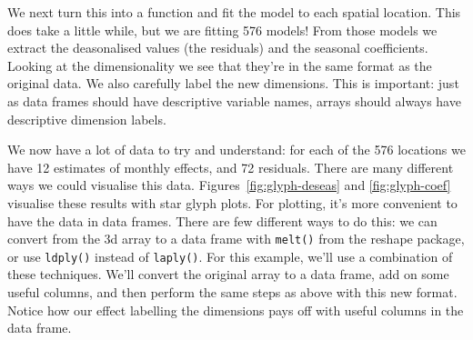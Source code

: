 \documentclass{scrartcl}
\newcommand{\f}[1]{\lstinline!#1()!}
\begin{document}
We next turn this into a function and fit the model to each spatial location.  This does take a little while, but we are fitting 576 models!  From those models we extract the deasonalised values (the residuals) and the seasonal coefficients.  Looking at the dimensionality we see that they're in the same format as the original data.  We also carefully label the new dimensions.  This is important: just as data frames should have descriptive variable names, arrays should always have descriptive dimension labels.

% 
% 
% 
% 


We now have a lot of data to try and understand: for each of the 576 locations we have 12 estimates of monthly effects, and 72 residuals.  There are many different ways we could visualise this data.  Figures~\ref{fig:glyph-deseas} and \ref{fig:glyph-coef} visualise these results with star glyph plots.  For plotting, it's more convenient to have the data in data frames.  There are few different ways to do this: we can convert from the 3d array to a data frame with \f{melt} from the reshape package, or use \f{ldply} instead of \f{laply}.  For this example, we'll use a combination of these techniques.  We'll convert the original array to a data frame, add on some useful columns, and then perform the same steps as above with this new format.  Notice how our effect labelling the dimensions pays off with useful columns in the data frame.

% 
% 
%  



%

\end{document}
